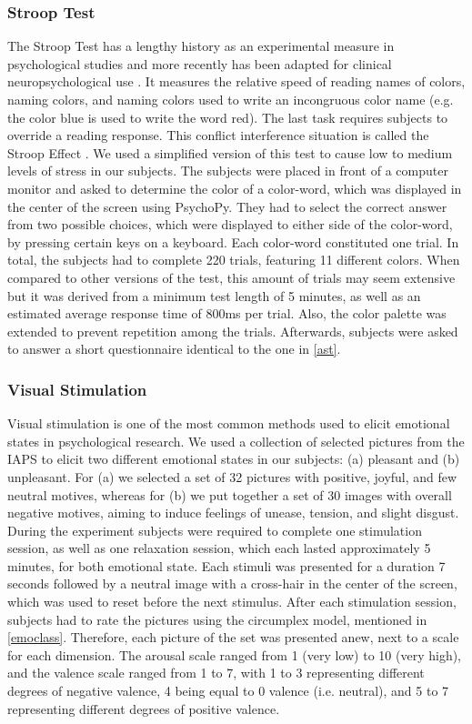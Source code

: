 \subsubsection{Stroop Test}
The Stroop Test has a lengthy history as an experimental measure in psychological studies and more recently has been adapted for clinical neuropsychological use \cite{mitrushina2005handbook}. It measures the relative speed of reading names of colors, naming colors, and naming colors used to write an incongruous color name (e.g. the color blue is used to write the word red). The last task requires subjects to override a reading response. This conflict interference situation is called the Stroop Effect \cite{mitrushina2005handbook}. 
We used a simplified version of this test to cause low to medium levels of stress in our subjects. The subjects were placed in front of a computer monitor and asked to determine the color of a color-word, which was displayed in the center of the screen using PsychoPy. They had to select the correct answer from two possible choices, which were displayed to either side of the color-word, by pressing certain keys on a keyboard. Each color-word constituted one trial. In total, the subjects had to complete 220 trials, featuring 11 different colors. When compared to other versions of the test, this amount of trials may seem extensive but it was derived from a minimum test length of 5 minutes, as well as an estimated average response time of 800ms per trial. Also, the color palette was extended to prevent repetition among the trials.
Afterwards, subjects were asked to answer a short questionnaire identical to the one in \ref{ast}.
\subsubsection{Visual Stimulation}\label{visstim}
Visual stimulation is one of the most common methods used to elicit emotional states in psychological research. We used a collection of selected pictures from the IAPS to elicit two different emotional states in our subjects: (a) pleasant and (b) unpleasant. For (a) we selected a set of 32 pictures with positive, joyful, and few neutral motives, whereas for (b) we put together a set of 30 images with overall negative motives, aiming to induce feelings of unease, tension, and slight disgust. During the experiment subjects were required to complete one stimulation session, as well as one relaxation session, which each lasted approximately 5 minutes, for both emotional state. Each stimuli was presented for a duration 7 seconds followed by a neutral image with a cross-hair in the center of the screen, which was used to reset before the next stimulus.
After each stimulation session, subjects had to rate the pictures using the circumplex model, mentioned in \ref{emoclass}. Therefore, each picture of the set was presented anew, next to a scale for each dimension. The arousal scale ranged from 1 (very low) to 10 (very high), and the valence scale ranged from 1 to 7, with 1 to 3 representing different degrees of negative valence, 4 being equal to 0 valence (i.e. neutral), and 5 to 7 representing different degrees of positive valence. 
